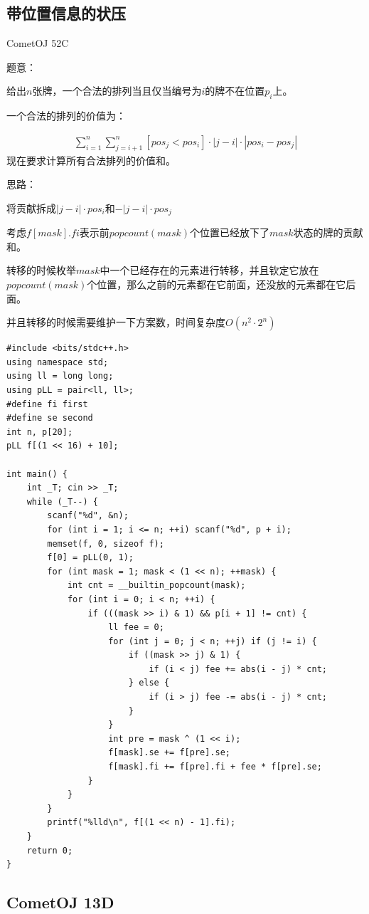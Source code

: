 \subsection{带位置信息的状压}
CometOJ 52C\par
题意：\par
给出$n$张牌，一个合法的排列当且仅当编号为$i$的牌不在位置$p_i$上。\par
一个合法的排列的价值为：\par
\begin{eqnarray*}
\sum\limits_{i = 1}^n\sum\limits_{j = i + 1}^n [pos_j < pos_i] \cdot |j - i| \cdot |pos_i - pos_j|
\end{eqnarray*}
现在要求计算所有合法排列的价值和。\par
思路：\par
将贡献拆成$|j - i| \cdot pos_i$和$-|j - i| \cdot pos_j$\par
考虑$f[mask].fi$表示前$popcount(mask)$个位置已经放下了$mask$状态的牌的贡献和。\par
转移的时候枚举$mask$中一个已经存在的元素进行转移，并且钦定它放在$popcount(mask)$个位置，那么之前的元素都在它前面，还没放的元素都在它后面。\par
并且转移的时候需要维护一下方案数，时间复杂度$O(n^2 \cdot 2^n)$

\begin{lstlisting}
#include <bits/stdc++.h>
using namespace std;
using ll = long long;
using pLL = pair<ll, ll>;
#define fi first
#define se second
int n, p[20];
pLL f[(1 << 16) + 10];

int main() {
	int _T; cin >> _T;
	while (_T--) {
		scanf("%d", &n);
		for (int i = 1; i <= n; ++i) scanf("%d", p + i);
		memset(f, 0, sizeof f);
		f[0] = pLL(0, 1);
		for (int mask = 1; mask < (1 << n); ++mask) {
			int cnt = __builtin_popcount(mask);
			for (int i = 0; i < n; ++i) {
				if (((mask >> i) & 1) && p[i + 1] != cnt) {
					ll fee = 0;
					for (int j = 0; j < n; ++j) if (j != i) {
						if ((mask >> j) & 1) {
							if (i < j) fee += abs(i - j) * cnt;
						} else {
							if (i > j) fee -= abs(i - j) * cnt;
						}
					}
					int pre = mask ^ (1 << i);
					f[mask].se += f[pre].se;
					f[mask].fi += f[pre].fi + fee * f[pre].se;
				}
			}
		}
		printf("%lld\n", f[(1 << n) - 1].fi);
	}
	return 0;
}
\end{lstlisting}


\subsection{CometOJ 13D}


